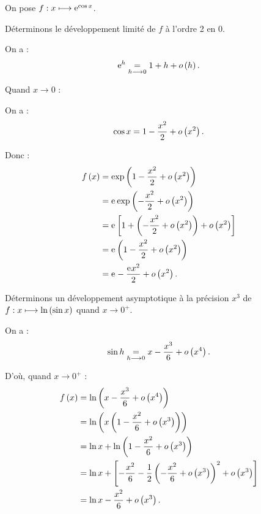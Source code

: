 \begin{ex}
On pose \(f:x\longmapsto\mathrm{e}^{\cos x}\).

Déterminons le développement limité de \(f\) à l'ordre 2 en \(0\).

On a : \[\mathrm{e}^{h}\underset{h\longrightarrow0}{=}1+h+o\left(h\right).\]

Quand \(x\to0\) :

On a : \[\cos x=1-\dfrac{x^2}{2}+o\left(x^2\right).\]

Donc : \[\begin{aligned}
f\left(x\right)&=\exp\left(1-\dfrac{x^2}{2}+o\left(x^2\right)\right) \\
&=\mathrm{e}^{}\exp\left(-\dfrac{x^2}{2}+o\left(x^2\right)\right) \\
&=\mathrm{e}^{}\left[1+\left(-\dfrac{x^2}{2}+o\left(x^2\right)\right)+o\left(x^2\right)\right] \\
&=\mathrm{e}^{}\left(1-\dfrac{x^2}{2}+o\left(x^2\right)\right) \\
&=\mathrm{e}^{}-\dfrac{\mathrm{e}^{}x^2}{2}+o\left(x^2\right).
\end{aligned}\]
\end{ex}

\begin{ex}
Déterminons un développement asymptotique à la précision \(x^3\) de \(f:x\longmapsto\ln\left(\sin x\right)\) quand \(x\to0^+\).

On a : \[\sin h\underset{h\longrightarrow0}{=}x-\dfrac{x^3}{6}+o\left(x^4\right).\]

D'où, quand \(x\to0^+\) : \[\begin{aligned}
f\left(x\right)&=\ln\left(x-\dfrac{x^3}{6}+o\left(x^4\right)\right) \\
&=\ln\left(x\left(1-\dfrac{x^2}{6}+o\left(x^3\right)\right)\right) \\
&=\ln x+\ln\left(1-\dfrac{x^2}{6}+o\left(x^3\right)\right) \\
&=\ln x+\left[-\dfrac{x^2}{6}-\dfrac{1}{2}\left(-\dfrac{x^2}{6}+o\left(x^3\right)\right)^2+o\left(x^3\right)\right] \\
&=\ln x-\dfrac{x^2}{6}+o\left(x^3\right).
\end{aligned}\]
\end{ex}
